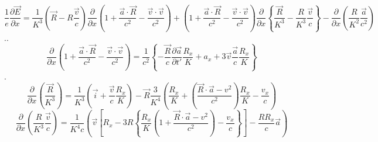 \documentclass[11pt]{article}
\begin{document}
\[\frac{1}{e}\frac{\partial \overrightarrow{E}}{\partial x}=\frac{1}{{{K}^{3}}}\left( \overrightarrow{R}-R\frac{\overrightarrow{v}}{c} \right)\frac{\partial }{\partial x}\left( 1+\frac{\overrightarrow{a}\cdot \overrightarrow{R}}{{{c}^{2}}}-\frac{\overrightarrow{v}\cdot \overrightarrow{v}}{{{c}^{2}}} \right)+\left( 1+\frac{\overrightarrow{a}\cdot \overrightarrow{R}}{{{c}^{2}}}-\frac{\overrightarrow{v}\cdot \overrightarrow{v}}{{{c}^{2}}} \right)\frac{\partial }{\partial x}\left\{ \frac{\overrightarrow{R}}{{{K}^{3}}}-\frac{R}{{{K}^{3}}}\frac{\overrightarrow{v}}{c} \right\}-\frac{\partial }{\partial x}\left( \frac{R}{{{K}^{2}}}\frac{\overrightarrow{a}}{{{c}^{2}}} \right)\]..
\[\frac{\partial }{\partial x}\left( 1+\frac{\overrightarrow{a}\cdot \overrightarrow{R}}{{{c}^{2}}}-\frac{\overrightarrow{v}\cdot \overrightarrow{v}}{{{c}^{2}}} \right)=\frac{1}{{{c}^{2}}}\left\{ -\frac{\overrightarrow{R}}{c}\frac{\partial \overrightarrow{a}}{\partial t'}\frac{{{R}_{x}}}{K}+{{a}_{x}}+3\overrightarrow{v}\frac{\overrightarrow{a}}{c}\frac{{{R}_{x}}}{K} \right\}\].
\[\frac{\partial }{\partial x}\left( \frac{\overrightarrow{R}}{{{K}^{3}}} \right)=\frac{1}{{{K}^{3}}}\left( \overrightarrow{i}+\frac{\overrightarrow{v}}{c}\frac{{{R}_{x}}}{K} \right)-\overrightarrow{R}\frac{3}{{{K}^{4}}}\left( \frac{{{R}_{x}}}{K}+\left( \frac{\overrightarrow{R}\cdot \overrightarrow{a}-{{v}^{2}}}{{{c}^{2}}} \right)\frac{{{R}_{x}}}{K}-\frac{{{v}_{x}}}{c} \right)\]
\[\frac{\partial }{\partial x}\left( \frac{R}{{{K}^{3}}}\frac{\overrightarrow{v}}{c} \right)=\frac{1}{{{K}^{4}}c}\left( \overrightarrow{v}\left[ {{R}_{x}}-3R\left\{ \frac{{{R}_{x}}}{K}\left( 1+\frac{\overrightarrow{R}\cdot \overrightarrow{a}-{{v}^{2}}}{{{c}^{2}}} \right)-\frac{{{v}_{x}}}{c} \right\} \right]-\frac{R{{R}_{x}}}{c}\overrightarrow{a} \right)\]
\end{document}
